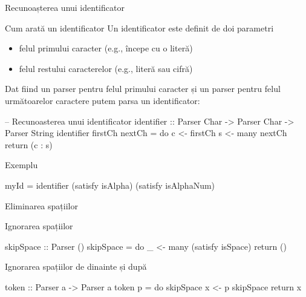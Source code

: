 \documentclass[xcolor=x11names,compress,10pt]{beamer}
\begin{document}
\begin{frame}[fragile]{Recunoașterea unui identificator}

\begin{block}{Cum arată un identificator}
  Un identificator este definit de doi parametri

  \begin{itemize}
    \item felul primului caracter (e.g., începe cu o literă)
    \item felul restului caracterelor (e.g., literă sau cifră)
  \end{itemize}
\end{block}

Dat fiind un parser pentru felul primului caracter și un parser pentru
felul următoarelor caractere putem parsa un identificator:

\begin{asciihs}
  -- Recunoasterea unui identificator
  identifier :: Parser Char -> Parser Char -> Parser String
  identifier firstCh nextCh = do   c <- firstCh
                                   s <- many nextCh
                                   return (c : s)
\end{asciihs}

Exemplu
\begin{asciihs}
  myId = identifier (satisfy isAlpha) (satisfy isAlphaNum)
\end{asciihs}
\end{frame}



\begin{frame}[fragile]{Eliminarea spațiilor}

\begin{block}{Ignorarea spațiilor}
\begin{asciihs}
skipSpace :: Parser ()
skipSpace = do  _ <- many (satisfy isSpace)
                return ()
\end{asciihs}
\end{block}


\begin{block}{Ignorarea spațiilor de dinainte și după}
\begin{asciihs}
token :: Parser a -> Parser a
token p = do  skipSpace
              x <- p
              skipSpace
              return x
\end{asciihs}
\end{block}

\end{frame}
  
\end{document}
